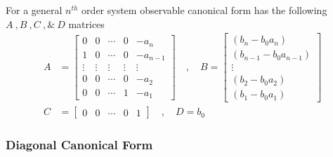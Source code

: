 \documentclass[twoside]{article}
\begin{document}
For a general $n^{th}$ order system observable
canonical form has the following $A \ ,  B \ ,  C \ , \& \ D$
matrices
%
\begin{align*}
A &= \left[ \begin{array}{ccccc} 0 & 0 & \cdots & 0 & -a_{n} 
              \\ 1 & 0 & \cdots & 0 & -a_{n-1} 
\\ \vdots & \vdots & \vdots & \vdots & \vdots
\\ 0 & 0 & \cdots & 0 & -a_2
    \\ 0 & 0 & \cdots & 1 & -a_1 \end{array} \right]
\quad , \quad 
B = \left[ \begin{array}{c} (b_n - b_0 a_n)  \\ (b_{n-1} - b_0
             a_{n-1}) \\ \vdots \\ (b_2 - b_0 a_2) \\   (b_1 - b_0
             a_1) 
\end{array} \right]
\\ C &= \left[ \begin{array}{ccccc} 0 & 0 & \cdots &  0 & 1 \end{array} \right]
\quad , \quad
D = b_0
\end{align*}
%
\subsubsection*{Diagonal Canonical Form}
\end{document}
